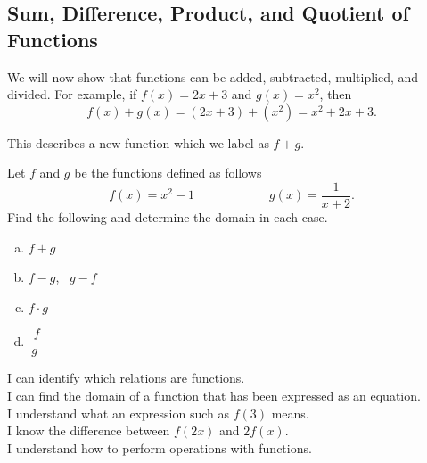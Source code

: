 \documentclass[oneside,10pt]{book}
\begin{document}
\newpage


\subsection{Sum, Difference, Product, and Quotient of Functions}

\example
We will now show that functions can be added, subtracted, multiplied, and
divided.
For example, if $f(x) = 2x+3$ and $g(x) = x^2 $, then
\[ f(x) + g(x) = (2x+3) + (x^2) = x^2 +2x + 3.\]

This describes a new function which we label as $f+g$.



\example
Let $f$ and $g$ be the functions defined as follows
\[ f(x) = x^2 -1 \hspace{1in} g(x) = \dfrac{1}{x+2}.\]
Find the following and determine the domain in each case.
\begin{enumerate}[(a)]
    \item
      $f+g$
    \item
      $f-g$, \, $g-f$
    \item
      $f\cdot g$
    \item
      $\dfrac{\phantom{i}f}{g}$
\end{enumerate}



\newpage



\begin{goals}
I can identify which relations are functions. \\
I can find the domain of a function that has been expressed as an equation.\\
I understand what an expression such as $f(3)$ means. \\
I know the difference between $f(2x)$ and $2f(x)$. \\
I understand how to perform operations with functions. \\
\end{goals}
\end{document}
